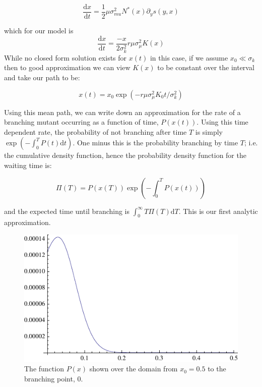 \documentclass[letterpaper,10pt]{article}
\newcommand{\ud}{\mathrm{d}}
\begin{document}
\begin{equation}
\frac{\ud x}{\ud t} = \frac{1}{2} \mu \sigma_{mu}^2 N^*(x) \partial_y s(y,x)
\end{equation}

which for our model is  
\begin{equation}
\frac{\ud x}{\ud t} = \frac{-x}{2\sigma_k^2} r \mu \sigma_{\mu}^2 K(x) 
\end{equation}
While no closed form solution exists for $x(t)$ in this case, if we assume $x_0 \ll \sigma_k$ then to good approximation we can view $K(x)$ to be constant over the interval and take our path to be:

\begin{equation}
x(t) = x_0 \exp\left( -r \mu \sigma_{\mu}^2 K_0 t/\sigma_k^2\right)
\end{equation}

Using this mean path, we can write down an approximation for the rate of a branching mutant occurring as a function of time, $P(x(t))$.  Using this time dependent rate, the probability of not branching after time $T$ is simply $\exp\left( - \int_0^T P(t)\ud t \right)$.  One minus this is the probability branching by time $T$; i.e. the cumulative density function, hence the probability density function for the waiting time is:

\begin{equation}
\Pi(T) = P(x(T)) \exp\left( -\int_0^T P(x(t)) \right)
\label{pdf}
\end{equation}

and the expected time until branching is $\int_0^{\infty} T \Pi(T) \ud T$. This is our first analytic approximation.  

\begin{figure}
\begin{center}
\includegraphics[width=.9\textwidth]{images/myp}
\caption{The function $P(x)$ shown over the domain from $x_0 = 0.5 $ to the branching point, 0.}
\end{center}
\end{figure}
\end{document}
